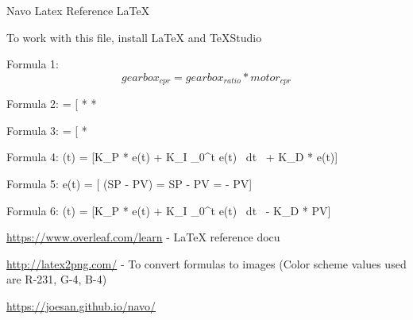 \documentclass{article}
\begin{document}
Navo Latex Reference \LaTeX

To work with this file, install LaTeX and TeXStudio

Formula 1:
\[ gearbox_{cpr} = gearbox_{ratio} * motor_{cpr} \]

Formula 2:
\rpm = [ *  * \]

Formula 3:
\rpm = [ * \]

Formula 4:
\output(t) = [K_{P} * e(t) + K_{I} \int\limits_0^t e(t) \ dt \ + K_{D} *  e(t)]

Formula 5:
 e(t) = [ (SP - PV) =  SP -  PV = -  PV]

Formula 6:
\output(t) = [K_{P} * e(t) + K_{I} \int\limits_0^t e(t) \ dt \ - K_{D} *  PV]

\url{https://www.overleaf.com/learn} - LaTeX reference docu

\url{http://latex2png.com/} - To convert formulas to images (Color scheme values used are R-231, G-4, B-4)

\url{https://joesan.github.io/navo/}
\end{document}
